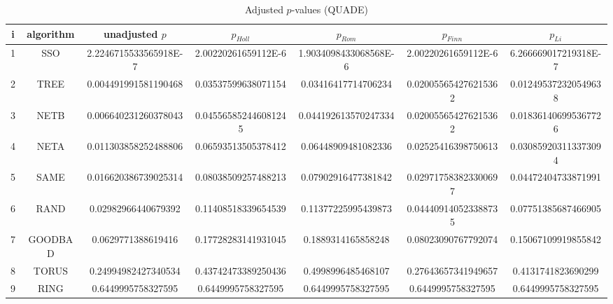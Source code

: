 \documentclass[a4paper,10pt]{article}
\begin{document}
\begin{landscape}
\begin{table}[!htp]
\centering\scriptsize
\caption{Adjusted $p$-values (QUADE)}
\begin{tabular}{ccccccc}
i&algorithm&unadjusted $p$&$p_{Holl}$&$p_{Rom}$&$p_{Finn}$&$p_{Li}$\\
\hline
1& SSO&2.2246715533565918E-7&2.00220261659112E-6&1.9034098433068568E-6&2.00220261659112E-6&6.266669017219318E-7\\
2& TREE&0.004491991581190468&0.03537599638071154&0.03416417714706234&0.020055654276215362&0.012495372320549638\\
3& NETB&0.006640231260378043&0.045565852446081245&0.044192613570247334&0.020055654276215362&0.018361406995367726\\
4& NETA&0.011303858252488806&0.06593513505378412&0.06448909481082336&0.02525416398750613&0.030859203113373094\\
5& SAME&0.016620386739025314&0.08038509257488213&0.07902916477381842&0.029717583823300697&0.04472404733871991\\
6& RAND&0.02982966440679392&0.11408518339654539&0.11377225995439873&0.044409140523388735&0.07751385687466905\\
7& GOODBAD&0.0629771388619416&0.17728283141931045&0.1889314165858248&0.08023090767792074&0.15067109919855842\\
8& TORUS&0.24994982427340534&0.43742473389250436&0.4998996485468107&0.27643657341949657&0.4131741823690299\\
9& RING&0.6449995758327595&0.6449995758327595&0.6449995758327595&0.6449995758327595&0.6449995758327595\\
\hline
\end{tabular}
\end{table}

\end{landscape}
\end{document}
